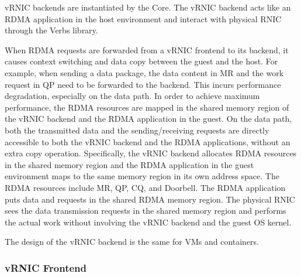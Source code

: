 vRNIC backends are instantiated by the \sys Core.
The vRNIC backend acts like an RDMA application in the host environment and interact with physical RNIC through the Verbs library.


When RDMA requests are forwarded from a vRNIC frontend to its backend, it causes context switching and data copy between the guest and the host. For example, when sending a data package, the data content in MR and the work request in QP need to be forwarded to the backend. This incurs performance degradation, especially on the data path. In order to achieve maximum performance, the RDMA resources are mapped in the shared memory region of the vRNIC backend and the RDMA application in the guest. On the data path, both the transmitted data and the sending/receiving requests are directly accessible to both the vRNIC backend and the RDMA applications, without an extra copy operation. Specifically, the vRNIC backend allocates RDMA resources in the shared memory region and the RDMA application in the guest environment maps to the same memory region in its own address space. The RDMA resources include MR, QP, CQ, and Doorbell. The RDMA application puts data and requests in the shared RDMA memory region. The physical RNIC sees the data transmission requests in the shared memory region and performs the actual work without involving the vRNIC backend and the guest OS kernel.

The design of the vRNIC backend is the same for VMs and containers.

\subsubsection{\textbf{vRNIC Frontend}}

